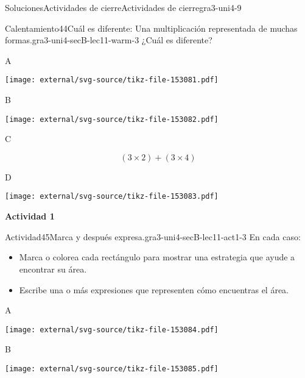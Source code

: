 \documentclass[twoside,10pt,]{article}
\begin{document}
\begin{solutions-section}{Soluciones}{Actividades de cierre}{}{Actividades de cierre}{}{}{gra3-uni4-9}
\begin{explorationsolution}{Calentamiento}{44}{Cuál es diferente: Una multiplicación representada de muchas formas.}{gra3-uni4-secB-lec11-warm-3}
¿Cuál es diferente?%
\begin{sidebyside}{2}{0.05}{0.05}{0.1}%
\begin{sbspanel}{0.4}%
A%
\par
\texttt{[image: external/svg-source/tikz-file-153081.pdf]}
\end{sbspanel}%
\begin{sbspanel}{0.4}%
B%
\par
\texttt{[image: external/svg-source/tikz-file-153082.pdf]}
\end{sbspanel}%
\end{sidebyside}%
\begin{sidebyside}{2}{0.05}{0.05}{0.1}%
\begin{sbspanel}{0.4}%
C%
\par
%
\begin{equation*}
(3\times 2) + (3\times 4)
\end{equation*}
%
\end{sbspanel}%
\begin{sbspanel}{0.4}%
D%
\par
\texttt{[image: external/svg-source/tikz-file-153083.pdf]}
\end{sbspanel}%
\end{sidebyside}%
\end{explorationsolution}%
\par\medskip
\noindent\textbf{\large{}\space\textperiodcentered\space{}Actividad 1}
\begin{activitysolution}{Actividad}{45}{Marca y después expresa.}{gra3-uni4-secB-lec11-act1-3}%
En cada caso:%
%
\begin{itemize}[label=\textbullet]
\item{}Marca o colorea cada rectángulo para mostrar una estrategia que ayude a encontrar su área.%
\item{}Escribe una o más expresiones que representen cómo encuentras el área.%
\end{itemize}
\begin{sidebyside}{3}{0}{0}{0}%
\begin{sbspanel}{0.391}%
A%
\par
\texttt{[image: external/svg-source/tikz-file-153084.pdf]}
\end{sbspanel}%
\begin{sbspanel}{0.261}%
B%
\par
\texttt{[image: external/svg-source/tikz-file-153085.pdf]}
\end{sbspanel}%

\end{sidebyside}
\end{activitysolution}
\end{solutions-section}
\end{document}
